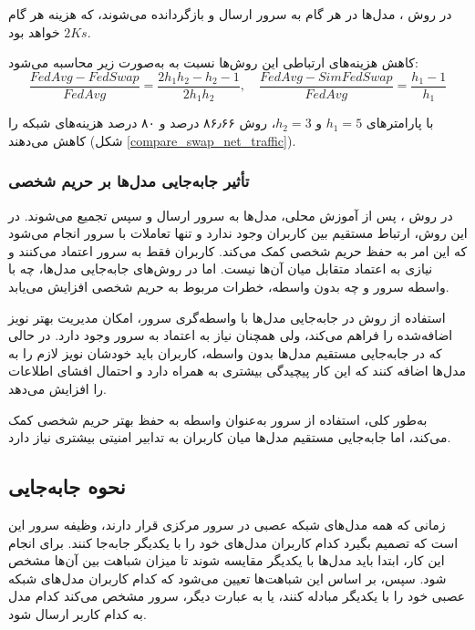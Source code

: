 در روش  
،  
مدل‌ها در هر گام به سرور ارسال و بازگردانده می‌شوند، که هزینه هر گام  
\( 2Ks \)  
خواهد بود.

کاهش هزینه‌های ارتباطی این روش‌ها نسبت به  
به‌صورت زیر محاسبه می‌شود:  
\[
\frac{FedAvg - FedSwap}{FedAvg} = \frac{2h_1h_2 - h_2 - 1}{2h_1h_2},  
\quad  
\frac{FedAvg - SimFedSwap}{FedAvg} = \frac{h_1 - 1}{h_1}  
\]  

با پارامترهای \(h_1 = 5\) و \(h_2 = 3\)، روش  
۸۶٫۶۶ درصد و  
۸۰ درصد هزینه‌های شبکه را کاهش می‌دهند  
(شکل \ref{compare_swap_net_traffic}).


\subsubsection{تأثیر جابه‌جایی مدل‌ها بر حریم شخصی}
در روش  
،  
پس از آموزش محلی، مدل‌ها به سرور ارسال و سپس تجمیع می‌شوند. در این روش، ارتباط مستقیم بین کاربران وجود ندارد و تنها تعاملات با سرور انجام می‌شود که این امر به حفظ حریم شخصی کمک می‌کند. کاربران فقط به سرور اعتماد می‌کنند و نیازی به اعتماد متقابل میان آن‌ها نیست.
اما در روش‌های جابه‌جایی مدل‌ها، چه با واسطه سرور و چه بدون واسطه، خطرات مربوط به حریم شخصی افزایش می‌یابد.

استفاده از روش  
در جابه‌جایی مدل‌ها با واسطه‌گری سرور، امکان مدیریت بهتر نویز اضافه‌شده را فراهم می‌کند، ولی همچنان نیاز به اعتماد به سرور وجود دارد. در حالی که در جابه‌جایی مستقیم مدل‌ها بدون واسطه، کاربران باید خودشان نویز لازم را به مدل‌ها اضافه کنند که این کار پیچیدگی بیشتری به همراه دارد و احتمال افشای اطلاعات را افزایش می‌دهد.

به‌طور کلی، استفاده از سرور به‌عنوان واسطه به حفظ بهتر حریم شخصی کمک می‌کند، اما جابه‌جایی مستقیم مدل‌ها میان کاربران به تدابیر امنیتی بیشتری نیاز دارد.





\subsection{نحوه جابه‌جایی}
زمانی که همه مدل‌های شبکه عصبی در سرور مرکزی قرار دارند، وظیفه سرور این است که تصمیم بگیرد کدام کاربران مدل‌های خود را با یکدیگر جابه‌جا کنند. برای انجام این کار، ابتدا باید مدل‌ها با یکدیگر مقایسه شوند تا میزان شباهت بین آن‌ها مشخص شود. سپس، بر اساس این شباهت‌ها تعیین می‌شود که کدام کاربران مدل‌های شبکه عصبی خود را با یکدیگر مبادله کنند، یا به عبارت دیگر، سرور مشخص می‌کند کدام مدل به کدام کاربر ارسال شود.

